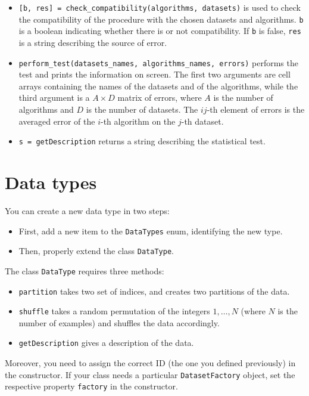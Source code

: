 \begin{itemize}
\item \verb|[b, res] = check_compatibility(algorithms, datasets)| is used
to check the compatibility of the procedure with the chosen datasets
and algorithms. \verb|b| is a boolean indicating whether there is or not
compatibility. If \verb|b| is false, \verb|res| is a string describing the source of error.
\item \verb|perform_test(datasets_names, algorithms_names, errors)| performs
the test and prints the information on screen. The first two arguments are cell arrays containing the names of the datasets and of the algorithms, while the third argument is a $A \times D$ matrix of errors, where $A$ is the number of algorithms and $D$ is the number of datasets. The $ij$-th element of errors is the averaged error of the $i$-th algorithm on the $j$-th dataset.
\item \verb|s = getDescription| returns a string describing the statistical test.
\end{itemize}

\section{Data types}

You can create a new data type in two steps:

\begin{itemize}
\item First, add a new item to the \verb|DataTypes| enum, identifying the new type.
\item Then, properly extend the class \verb|DataType|. 
\end{itemize}

The class \verb|DataType| requires three methods:

\begin{itemize}
\item \verb|partition| takes two set of indices, and creates two partitions of the data.
\item \verb|shuffle| takes a random permutation of the integers $1,\ldots,N$ (where $N$ is the number of examples) and shuffles the data accordingly.
\item \verb|getDescription| gives a description of the data.
\end{itemize}

Moreover, you need to assign the correct ID (the one you defined previously) in the constructor. If your class needs a particular \verb|DatasetFactory| object, set the respective property \verb|factory| in the constructor.

